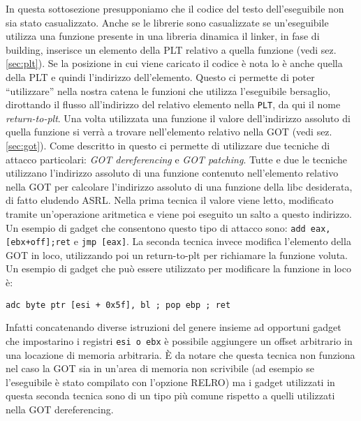 In questa sottosezione presupponiamo che il codice del testo
dell'eseguibile non sia stato casualizzato. Anche se le librerie sono
casualizzate se un'eseguibile utilizza una funzione presente in una
libreria dinamica il linker, in fase di building, inserisce un
elemento della PLT relativo a quella funzione (vedi
sez. \ref{sec:plt}). Se la posizione in cui viene caricato il codice è
nota lo è anche quella della PLT e quindi l'indirizzo
dell'elemento. Questo ci permette di poter ``utilizzare'' nella nostra
catena le funzioni che utilizza l'eseguibile bersaglio, dirottando il
flusso all'indirizzo del relativo elemento nella \lstinline{PLT}, da
qui il nome \emph{return-to-plt}. Una volta utilizzata una funzione il
valore dell'indirizzo assoluto di quella funzione si verrà a trovare
nell'elemento relativo nella GOT (vedi sez. \ref{sec:got}). Come
descritto in \cite{roglia:2009} questo ci permette di utilizzare due
tecniche di attacco particolari: \emph{GOT dereferencing} e \emph{GOT
  patching}. Tutte e due le tecniche utilizzano l'indirizzo assoluto
di una funzione contenuto nell'elemento relativo nella GOT per
calcolare l'indirizzo assoluto di una funzione della libc desiderata,
di fatto eludendo ASRL. Nella prima tecnica il valore viene letto,
modificato tramite un'operazione aritmetica e viene poi eseguito un
salto a questo indirizzo. Un esempio di gadget che consentono questo
tipo di attacco sono: \lstinline{add eax,[ebx+off];ret} e
\lstinline{jmp [eax]}. La seconda tecnica invece modifica l'elemento
della GOT in loco, utilizzando poi un return-to-plt per richiamare la
funzione voluta. Un esempio di gadget che può essere utilizzato per
modificare la funzione in loco è:

\lstinline{adc byte ptr [esi + 0x5f], bl ; pop ebp ; ret}

Infatti concatenando diverse istruzioni del genere insieme ad
opportuni gadget che impostarino i registri \lstinline{esi o ebx} è
possibile aggiungere un offset arbitrario in una locazione di memoria
arbitraria. È da notare che questa tecnica non funziona nel caso la
GOT sia in un'area di memoria non scrivibile (ad esempio se
l'eseguibile è stato compilato con l'opzione RELRO) ma i gadget
utilizzati in questa seconda tecnica sono di un tipo più comune
rispetto a quelli utilizzati nella GOT dereferencing.


